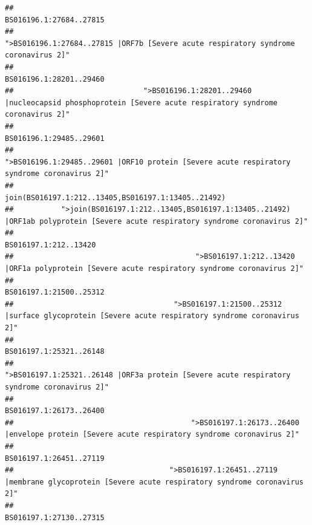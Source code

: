 \documentclass[
]{article}
\begin{document}
\begin{verbatim}
##                                                                                                                BS016196.1:27684..27815 
##                                                    ">BS016196.1:27684..27815 |ORF7b [Severe acute respiratory syndrome coronavirus 2]" 
##                                                                                                                BS016196.1:28201..29460 
##                              ">BS016196.1:28201..29460 |nucleocapsid phosphoprotein [Severe acute respiratory syndrome coronavirus 2]" 
##                                                                                                                BS016196.1:29485..29601 
##                                            ">BS016196.1:29485..29601 |ORF10 protein [Severe acute respiratory syndrome coronavirus 2]" 
##                                                                                    join(BS016197.1:212..13405,BS016197.1:13405..21492) 
##           ">join(BS016197.1:212..13405,BS016197.1:13405..21492) |ORF1ab polyprotein [Severe acute respiratory syndrome coronavirus 2]" 
##                                                                                                                  BS016197.1:212..13420 
##                                          ">BS016197.1:212..13420 |ORF1a polyprotein [Severe acute respiratory syndrome coronavirus 2]" 
##                                                                                                                BS016197.1:21500..25312 
##                                     ">BS016197.1:21500..25312 |surface glycoprotein [Severe acute respiratory syndrome coronavirus 2]" 
##                                                                                                                BS016197.1:25321..26148 
##                                            ">BS016197.1:25321..26148 |ORF3a protein [Severe acute respiratory syndrome coronavirus 2]" 
##                                                                                                                BS016197.1:26173..26400 
##                                         ">BS016197.1:26173..26400 |envelope protein [Severe acute respiratory syndrome coronavirus 2]" 
##                                                                                                                BS016197.1:26451..27119 
##                                    ">BS016197.1:26451..27119 |membrane glycoprotein [Severe acute respiratory syndrome coronavirus 2]" 
##                                                                                                                BS016197.1:27130..27315 

\end{verbatim}
\end{document}
